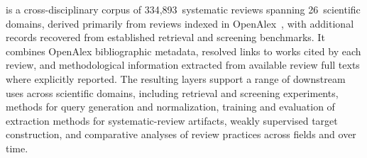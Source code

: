 \webisSRCorpus{} is a cross-disciplinary corpus of 334,893~systematic reviews spanning 26~scientific domains, derived primarily from reviews indexed in OpenAlex~\cite{Priem2022OpenAlexAF}, with additional records recovered from established retrieval and screening benchmarks. It combines OpenAlex bibliographic metadata, resolved links to works cited by each review, and methodological information extracted from available review full texts where explicitly reported. 
The resulting layers support a range of downstream uses across scientific domains, including retrieval and screening experiments, methods for query generation and normalization, training and evaluation of extraction methods for systematic-review artifacts, weakly supervised target construction, and comparative analyses of review practices across fields and over time.